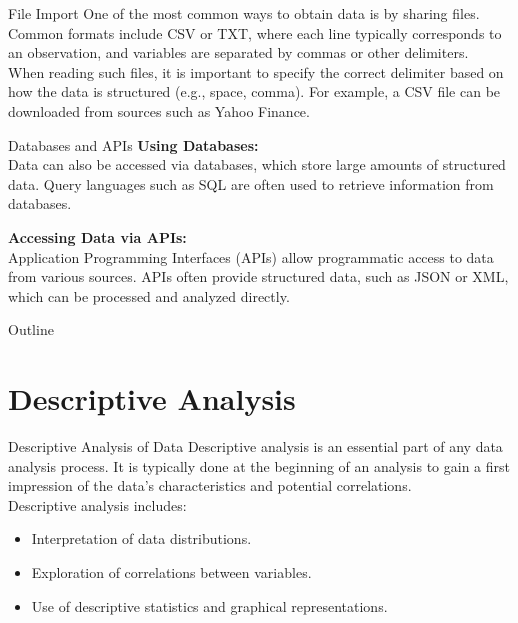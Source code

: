 \documentclass{beamer}
\begin{document}
	\begin{frame}{File Import}
		One of the most common ways to obtain data is by sharing files. Common formats include CSV or TXT, where each line typically corresponds to an observation, and variables are separated by commas or other delimiters. \\
		\vspace{0.5cm}
		When reading such files, it is important to specify the correct delimiter based on how the data is structured (e.g., space, comma). For example, a CSV file can be downloaded from sources such as Yahoo Finance.
	\end{frame}
	
	\begin{frame}{Databases and APIs}
		\textbf{Using Databases:} \\
		Data can also be accessed via databases, which store large amounts of structured data. Query languages such as SQL are often used to retrieve information from databases. \\
		\vspace{0.5cm}
		
		\textbf{Accessing Data via APIs:} \\
		Application Programming Interfaces (APIs) allow programmatic access to data from various sources. APIs often provide structured data, such as JSON or XML, which can be processed and analyzed directly.
	\end{frame}
	
	\begin{frame}{Outline}
		\tableofcontents
	\end{frame}
	
	\section{Descriptive Analysis}
	\begin{frame}{Descriptive Analysis of Data}
		Descriptive analysis is an essential part of any data analysis process. It is typically done at the beginning of an analysis to gain a first impression of the data's characteristics and potential correlations. \\
		\vspace{0.5cm}
		Descriptive analysis includes:
		\begin{itemize}
			\item Interpretation of data distributions.
			\item Exploration of correlations between variables.
			\item Use of descriptive statistics and graphical representations.
		\end{itemize}
	\end{frame}
	
\end{document}
